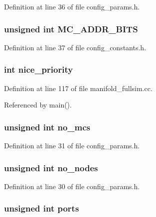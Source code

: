Definition at line 36 of file config\_\-params.h.
\subsubsection[{MC\_\-ADDR\_\-BITS}]{\setlength{\rightskip}{0pt plus 5cm}unsigned int {\bf MC\_\-ADDR\_\-BITS}}\label{sim_8h_5797f7fc969d8a7c02df4ba708ed734f}




Definition at line 37 of file config\_\-constants.h.
\subsubsection[{nice\_\-priority}]{\setlength{\rightskip}{0pt plus 5cm}int {\bf nice\_\-priority}}\label{sim_8h_1cb688b2b9eda644e545e25f039761e4}




Definition at line 117 of file manifold\_\-fullsim.cc.

Referenced by main().
\subsubsection[{no\_\-mcs}]{\setlength{\rightskip}{0pt plus 5cm}unsigned int {\bf no\_\-mcs}}\label{sim_8h_544ce85a29feb73c485a704009deffd1}




Definition at line 31 of file config\_\-params.h.
\subsubsection[{no\_\-nodes}]{\setlength{\rightskip}{0pt plus 5cm}unsigned int {\bf no\_\-nodes}}\label{sim_8h_e6ac8ea6f14ad67a94df03963a6613d1}




Definition at line 30 of file config\_\-params.h.
\subsubsection[{ports}]{\setlength{\rightskip}{0pt plus 5cm}unsigned int {\bf ports}}\label{sim_8h_e9035ab8a30b22227c82949064511570}




